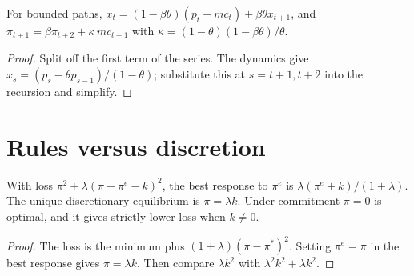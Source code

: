 \begin{theorem}
\label{thm:calvo_nkpc}
\leanok
{}
For bounded paths, $x_t = (1-\beta\theta)(p_t + mc_t) + \beta\theta x_{t+1}$, and
$\pi_{t+1} = \beta\pi_{t+2} + \kappa\,mc_{t+1}$ with $\kappa = (1-\theta)(1-\beta\theta)/\theta$.
\end{theorem}
\begin{proof}
\leanok
Split off the first term of the series. The dynamics give $x_s = (p_s - \theta p_{s-1})/(1-\theta)$; substitute this at
$s = t+1, t+2$ into the recursion and simplify.
\end{proof}

\section{Rules versus discretion}

\begin{theorem}
\label{thm:barro_gordon}
\leanok
With loss $\pi^2 + \lambda(\pi - \pi^e - k)^2$, the best response to $\pi^e$ is $\lambda(\pi^e + k)/(1+\lambda)$. The
unique discretionary equilibrium is $\pi = \lambda k$. Under commitment $\pi = 0$ is optimal, and it gives strictly lower loss when
$k \ne 0$.
\end{theorem}
\begin{proof}
\leanok
The loss is the minimum plus $(1+\lambda)(\pi - \pi^*)^2$. Setting $\pi^e = \pi$ in the best response gives $\pi = \lambda k$.
Then compare $\lambda k^2$ with $\lambda^2k^2 + \lambda k^2$.
\end{proof}
